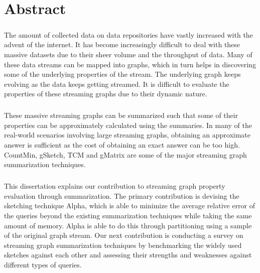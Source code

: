 \chapter*{Abstract}

\paragraph{}
The amount of collected data on data repositories have vastly increased with the advent of the internet. It has become increasingly difficult to deal with these massive datasets due to their sheer volume and the throughput of data. Many of these data streams can be mapped into graphs, which in turn helps in discovering some of the underlying properties of the stream. The underlying graph keeps evolving as the data keeps getting streamed. It is difficult to evaluate the properties of these streaming graphs due to their dynamic nature. 

\paragraph{}
These massive streaming graphs can be summarized such that some of their properties can be approximately calculated using the summaries. In many of the real-world scenarios involving large streaming graphs, obtaining an approximate answer is sufficient as the cost of obtaining an exact answer can be too high. CountMin, gSketch, TCM and gMatrix are some of the major streaming graph summarization techniques. 

\paragraph{}
This dissertation explains our contribution to streaming graph property evaluation through summarization. The primary contribution is devising the sketching technique Alpha, which is able to minimize the average relative error of the queries beyond the existing summarization techniques while taking the same amount of memory. Alpha is able to do this through partitioning using a sample of the original graph stream. Our next contribution is conducting a survey on streaming graph summarization techniques by benchmarking the widely used sketches against each other and assessing their strengths and weaknesses against different types of queries. 